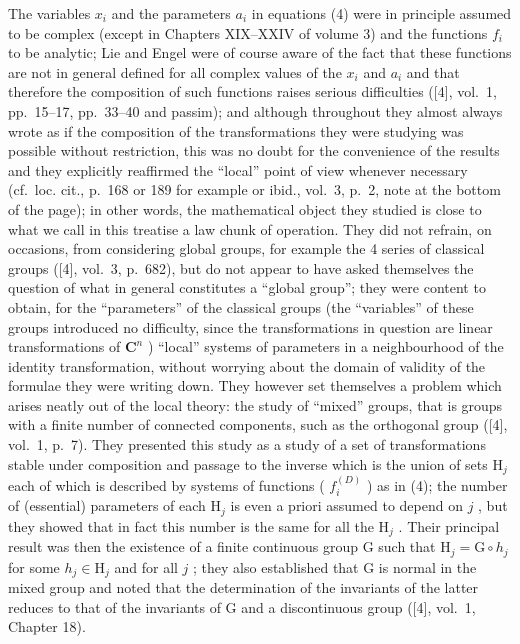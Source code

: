 The variables \(x_{i}\) and the parameters \(a_{i}\) in equations (4) were in principle assumed to be complex (except in Chapters XIX--XXIV of volume 3) and the functions \(f_{i}\) to be analytic; Lie and Engel were of course aware of the fact that these functions are not in general defined for all complex values of the \(x_{i}\) and \(a_{i}\) and that therefore the composition of such functions raises serious difficulties ({[}4{]}, vol.~1, pp.~15--17, pp.~33--40 and passim); and although throughout they almost always wrote as if the composition of the transformations they were studying was possible without restriction, this was no doubt for the convenience of the results and they explicitly reaffirmed the ``local'' point of view whenever necessary (cf.~loc. cit., p.~168 or 189 for example or ibid., vol.~3, p.~2, note at the bottom of the page); in other words, the mathematical object they studied is close to what we call in this treatise a law chunk of operation. They did not refrain, on occasions, from considering global groups, for example the 4 series of classical groups ({[}4{]}, vol.~3, p.~682), but do not appear to have asked themselves the question of what in general constitutes a ``global group''; they were content to obtain, for the ``parameters'' of the classical groups (the ``variables'' of these groups introduced no difficulty, since the transformations in question are linear transformations of \(\mathbf{C}^n\) ) ``local'' systems of parameters in a neighbourhood of the identity transformation, without worrying about the domain of validity of the formulae they were writing down. They however set themselves a problem which arises neatly out of the local theory: the study of ``mixed'' groups, that is groups with a finite number of connected components, such as the orthogonal group ({[}4{]}, vol.~1, p.~7). They presented this study as a study of a set of transformations stable under composition and passage to the inverse which is the union of sets \(\mathrm{H}_j\) each of which is described by systems of functions ( \(f_i^{(D)}\) ) as in (4); the number of (essential) parameters of each \(\mathrm{H}_j\) is even a priori assumed to depend on \(j\) , but they showed that in fact this number is the same for all the \(\mathrm{H}_j\) . Their principal result was then the existence of a finite continuous group G such that \(\mathrm{H}_j = \mathrm{G} \circ h_j\) for some \(h_j \in \mathrm{H}_j\) and for all \(j\) ; they also established that G is normal in the mixed group and noted that the determination of the invariants of the latter reduces to that of the invariants of G and a discontinuous group ({[}4{]}, vol.~1, Chapter 18).

